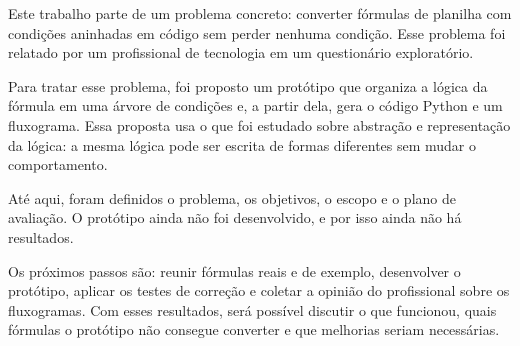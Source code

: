 Este trabalho parte de um problema concreto: converter fórmulas de planilha com condições aninhadas em código sem perder nenhuma condição. Esse problema foi relatado por um profissional de tecnologia em um questionário exploratório.

Para tratar esse problema, foi proposto um protótipo que organiza a lógica da fórmula em uma árvore de condições e, a partir dela, gera o código Python e um fluxograma. Essa proposta usa o que foi estudado sobre abstração e representação da lógica: a mesma lógica pode ser escrita de formas diferentes sem mudar o comportamento.

Até aqui, foram definidos o problema, os objetivos, o escopo e o plano de avaliação. O protótipo ainda não foi desenvolvido, e por isso ainda não há resultados.

Os próximos passos são: reunir fórmulas reais e de exemplo, desenvolver o protótipo, aplicar os testes de correção e coletar a opinião do profissional sobre os fluxogramas. Com esses resultados, será possível discutir o que funcionou, quais fórmulas o protótipo não consegue converter e que melhorias seriam necessárias.
